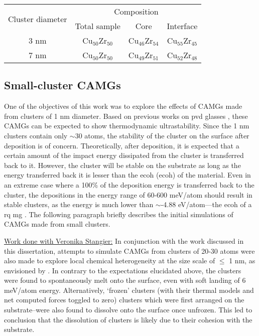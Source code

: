 \begin{table} \centering
	\begin{tabular}{c c c c} 
		\hline \hline	
	    \multirow{2}{2cm}{\centering Cluster diameter} & \multicolumn{3}{c}{Composition}\\
		 & Total sample & Core & Interface \\
		\hline	
		3 nm	& Cu$_{50}$Zr$_{50}$ & Cu$_{46}$Zr$_{54}$ & Cu$_{55}$Zr$_{45}$ \\
		7 nm	& Cu$_{50}$Zr$_{50}$ & Cu$_{49}$Zr$_{51}$ & Cu$_{52}$Zr$_{48}$ \\
		\hline \hline	
	\end{tabular}
	\label{t:chem_heter}
\end{table}

\subsection{Small-cluster CAMGs}
One of the objectives of this work was to explore the effects of CAMGs made from clusters of 1 nm diameter. Based on previous works on \gls{pvd} glasses \cite{Singh2013,Raegen2020}, these CAMGs can be expected to show thermodynamic ultrastability. Since the 1 nm clusters contain only $\sim$30 atoms, the stability of the cluster on the surface after deposition is of concern. Theoretically, after deposition, it is expected that a certain amount of the impact energy dissipated from the cluster is transferred back to it. However, the cluster will be stable on the substrate as long as the energy transferred back it is lesser than the \glsdesc{ecoh} (\gls{ecoh}) of the material. Even in an extreme case where a 100\% of the deposition energy is transferred back to the cluster, the depositions in the energy range of 60-600 meV/atom should result in stable clusters, as the energy is much lower than $\sim$-4.88 eV/atom---the \gls{ecoh} of a \cz \gls{rq} \gls{mg} \cite{Jekal2019}. The following paragraph briefly describes the initial simulations of CAMGs made from small clusters.  \par

{\underline{Work done with Veronika Stangier:}} In conjunction with the work discussed in this dissertation, attempts to simulate \cz CAMGs from clusters of 20-30 atoms were also made to explore local chemical heterogeneity at the size scale of $\leq$ 1 nm, as envisioned by \textcite{Kartouzian2014}. In contrary to the expectations elucidated above, the clusters were found to spontaneously melt onto the surface, even with soft landing of 6 meV/atom energy. Alternatively, `frozen' clusters (with their thermal models and net computed forces toggled to zero) clusters which were first arranged on the substrate--were also found to dissolve onto the surface once unfrozen. This led to conclusion that the dissolution of clusters is likely due to their cohesion with the \cz substrate. \par

